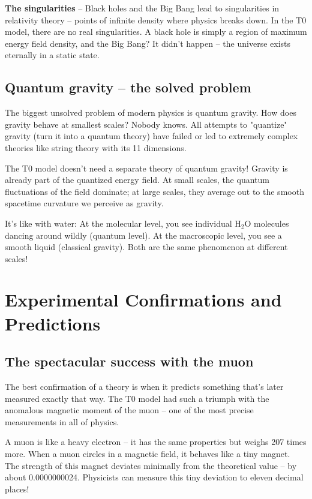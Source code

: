 \documentclass[12pt,a4paper]{article}
\begin{document}
	\textbf{The singularities} -- Black holes and the Big Bang lead to singularities in relativity theory -- points of infinite density where physics breaks down. In the T0 model, there are no real singularities. A black hole is simply a region of maximum energy field density, and the Big Bang? It didn't happen -- the universe exists eternally in a static state.
	
	\subsection{Quantum gravity -- the solved problem}
	
	The biggest unsolved problem of modern physics is quantum gravity. How does gravity behave at smallest scales? Nobody knows. All attempts to "quantize" gravity (turn it into a quantum theory) have failed or led to extremely complex theories like string theory with its 11 dimensions.
	
	\begin{important}
		The T0 model doesn't need a separate theory of quantum gravity! Gravity is already part of the quantized energy field. At small scales, the quantum fluctuations of the field dominate; at large scales, they average out to the smooth spacetime curvature we perceive as gravity.
		
		It's like with water: At the molecular level, you see individual H$_2$O molecules dancing around wildly (quantum level). At the macroscopic level, you see a smooth liquid (classical gravity). Both are the same phenomenon at different scales!
	\end{important}
	
	\section{Experimental Confirmations and Predictions}
	
	\subsection{The spectacular success with the muon}
	
	The best confirmation of a theory is when it predicts something that's later measured exactly that way. The T0 model had such a triumph with the anomalous magnetic moment of the muon -- one of the most precise measurements in all of physics.
	
	A muon is like a heavy electron -- it has the same properties but weighs 207 times more. When a muon circles in a magnetic field, it behaves like a tiny magnet. The strength of this magnet deviates minimally from the theoretical value -- by about 0.0000000024. Physicists can measure this tiny deviation to eleven decimal places!
	
\end{document}

